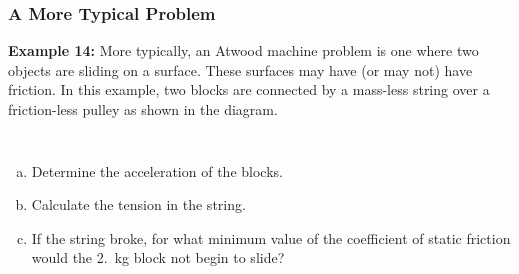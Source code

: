 \documentclass[12pt,compress,aspectratio=169]{beamer}
\begin{document}
\begin{frame}
  \frametitle{A More Typical Problem}
  \textbf{Example 14:}
  More typically, an Atwood machine problem is one where two objects are
  sliding on a surface. These surfaces may have (or may not) have friction.
  In this example, two blocks are connected by a mass-less string over a
  friction-less pulley as shown in the diagram.
  \begin{columns}

    \begin{enumerate}[(a)]
    \item Determine the acceleration of the blocks.
    \item Calculate the tension in the string.
    \item If the string broke, for what minimum value of the coefficient of
      static friction would the \SI{2.}{kg} block not begin to slide?
    \end{enumerate}
  \end{columns}
\end{frame}
\end{document}
